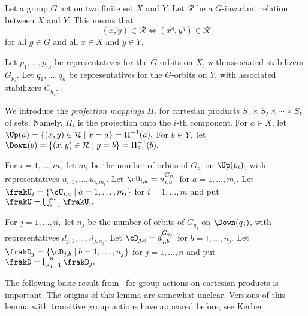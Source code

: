 





Let a group $G$ act on two finite set $X$ and $Y$. 
Let ${\mathcal R}$ be a $G$-invariant relation between $X$ and $Y.$ 
This means that 
$$
(x,y) \in {\mathcal R} \iff 
(x^g,y^g) \in {\mathcal R} 
$$
for all $g \in G$ and all $x \in X$ and $y \in Y$.

\bigskip

 
Let $p_1,\ldots,p_m$ be representatives for the $G$-orbits on $X$, with associated stabilizers $G_{p_i}.$ 
Let $q_1,\ldots,q_n$ be representatives for the $G$-orbits on $Y$, with associated stabilizers $G_{q_j}.$

\bigskip

We introduce the {\em projection mappings} $\Pi_i$ for 
cartesian products $S_1 \times S_2 \times \cdots \times S_k$ of sets. 
Namely, $\Pi_i$ is the projection onto the $i$-th component.
For $a \in X$, let $\Up(a) = \{ (x,y) \in {\mathcal R} \mid x = a \} = \Pi_1^{-1}(a).$
For $b \in Y,$ let $\Down(b) = \{ (x,y) \in {\mathcal R}  \mid y = b \}= \Pi_2^{-1}(b).$

\bigskip

For $i = 1,\ldots,m,$ let $m_i$ be the number of orbits of $G_{p_i}$ on $\Up(p_i)$, 
with representatives $u_{i,1}, \ldots, u_{i,m_i}.$
Let $\cU_{i,a} = u_{i,a}^{G_{p_i}}$ for $a=1,\ldots,m_i.$ 
Let $\frakU_i = \{ \cU_{i,a} \mid a=1,\ldots,m_i \}$ for $i=1,\ldots, m$ 
and put $\frakU = \bigcup_{i=1}^m \frakU_i.$

\bigskip

For $j = 1,\ldots,n,$ let $n_j$ be the number of orbits of $G_{q_j}$ on $\Down(q_j)$, 
with representatives $d_{j,1}, \ldots, d_{j,n_j}.$
Let $\cD_{j,b} = d_{j,b}^{G_{q_j}}$ for $b=1,\ldots,n_j.$ 
Let 
$\frakD_j = \{ \cD_{j,b} \mid b=1,\ldots,n_j \}$ for $j=1,\ldots,n$ 
and put $\frakD = \bigcup_{j=1}^n \frakD_j.$



\bigskip

The following basic result from~\cite{BettenBLT} 
for group actions on cartesian products is important. 
The origins of this lemma are somewhat unclear. 
Versions of this lemma with transitive group actions 
have appeared before, see Kerber~\cite[1.2.15]{Kerber99}.

